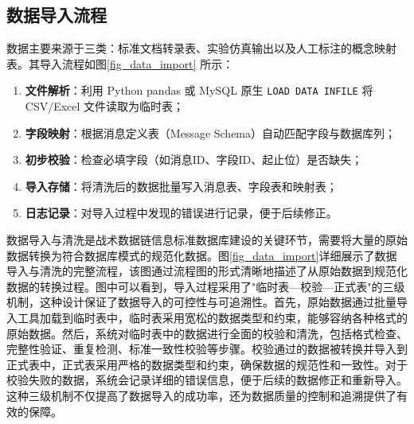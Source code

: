 \subsection{数据导入流程}
数据主要来源于三类：标准文档转录表、实验仿真输出以及人工标注的概念映射表。其导入流程如图\ref{fig_data_import} 所示：
\begin{enumerate}
  \item \textbf{文件解析}：利用 Python pandas 或 MySQL 原生 \texttt{LOAD DATA INFILE} 将 CSV/Excel 文件读取为临时表；
  \item \textbf{字段映射}：根据消息定义表（Message Schema）自动匹配字段与数据库列；
  \item \textbf{初步校验}：检查必填字段（如消息ID、字段ID、起止位）是否缺失；
  \item \textbf{导入存储}：将清洗后的数据批量写入消息表、字段表和映射表；
  \item \textbf{日志记录}：对导入过程中发现的错误进行记录，便于后续修正。
\end{enumerate}

数据导入与清洗是战术数据链信息标准数据库建设的关键环节，需要将大量的原始数据转换为符合数据库模式的规范化数据。图\ref{fig_data_import}详细展示了数据导入与清洗的完整流程，该图通过流程图的形式清晰地描述了从原始数据到规范化数据的转换过程。图中可以看到，导入过程采用了"临时表—校验—正式表"的三级机制，这种设计保证了数据导入的可控性与可追溯性。首先，原始数据通过批量导入工具加载到临时表中，临时表采用宽松的数据类型和约束，能够容纳各种格式的原始数据。然后，系统对临时表中的数据进行全面的校验和清洗，包括格式检查、完整性验证、重复检测、标准一致性校验等步骤。校验通过的数据被转换并导入到正式表中，正式表采用严格的数据类型和约束，确保数据的规范性和一致性。对于校验失败的数据，系统会记录详细的错误信息，便于后续的数据修正和重新导入。这种三级机制不仅提高了数据导入的成功率，还为数据质量的控制和追溯提供了有效的保障。

